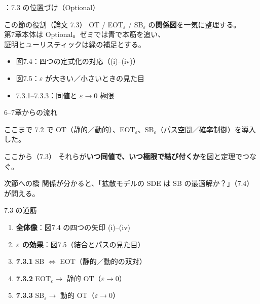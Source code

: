 

\assuppl
\begin{frame}{\supplmark：7.3 の位置づけ（Optional）}
    \begin{block}{この節の役割（論文 7.3）}
        OT / EOT$_\varepsilon$ / SB$_\varepsilon$ の\textbf{関係図}を一気に整理する。\\
        第7章本体は Optional。ゼミでは青で本筋を追い、\\
        証明ヒューリスティックは緑の補足とする。
    \end{block}
    \begin{itemize}
        \item 図7.4：四つの定式化の対応（(i)--(iv)）
        \item 図7.5：$\varepsilon$ が大きい／小さいときの見た目
        \item 7.3.1--7.3.3：同値と $\varepsilon\to 0$ 極限
    \end{itemize}
\end{frame}
\asmain
\begin{frame}{6--7章からの流れ}
    \begin{block}{ここまで}
        7.2 で OT（静的／動的）、EOT$_\varepsilon$、SB$_\varepsilon$（パス空間／確率制御）を導入した。
    \end{block}
    \begin{block}{ここから（7.3）}
        それらが\textbf{いつ同値で、いつ極限で結び付くか}を図と定理でつなぐ。
    \end{block}
    \begin{exampleblock}{次節への橋}
        関係が分かると、「拡散モデルの SDE は SB の最適解か？」（7.4）が問える。
    \end{exampleblock}
\end{frame}
\asmain
\begin{frame}{7.3 の道筋}
    \begin{enumerate}
        \item \textbf{全体像}：図7.4 の四つの矢印 (i)--(iv)
        \item \textbf{$\varepsilon$ の効果}：図7.5（結合とパスの見た目）
        \item \textbf{7.3.1} SB $\Leftrightarrow$ EOT（静的／動的の双対）
        \item \textbf{7.3.2} EOT$_\varepsilon\to$ 静的 OT（$\varepsilon\to 0$）
        \item \textbf{7.3.3} SB$_\varepsilon\to$ 動的 OT（$\varepsilon\to 0$）
    \end{enumerate}
\end{frame}
